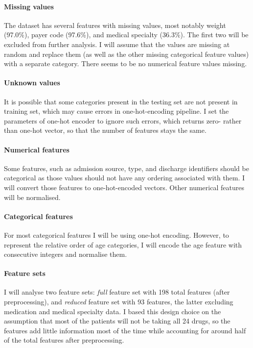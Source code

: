 \documentclass[10pt, twocolumn]{article}
\begin{document}
\paragraph{Missing values} The dataset has several features with missing values, most notably weight (97.0\%), payer code (97.6\%), and medical specialty (36.3\%). The first two will be excluded from further analysis. I will assume that the values are missing at random and replace them (as well as the other missing categorical feature values) with a separate category. There seems to be no numerical feature values missing.

\paragraph{Unknown values} It is possible that some categories present in the testing set are not present in training set, which may cause errors in one-hot-encoding pipeline. I set the parameters of one-hot encoder to ignore such errors, which returns zero- rather than one-hot vector, so that the number of features stays the same.

\paragraph{Numerical features} Some features, such as admission source, type, and discharge identifiers should be categorical as those values should not have any ordering associated with them. I will convert those features to one-hot-encoded vectors. Other numerical features will be normalised.

\paragraph{Categorical features} For most categorical features I will be using one-hot encoding. However, to represent the relative order of age categories, I will encode the age feature with consecutive integers and normalise them.

\paragraph{Feature sets} I will analyse two feature sets: \textit{full} feature set with 198 total features (after preprocessing), and \textit{reduced} feature set with 93 features, the latter excluding medication and medical specialty data. I based this design choice on the assumption that most of the patients will not be taking all 24 drugs, so the features add little information most of the time while accounting for around half of the total features after preprocessing.
\end{document}
